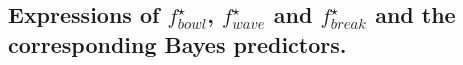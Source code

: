 \documentclass{article}
\newcommand{\E}{\mathbb{E}}
\newcommand{\sqb}[1]{\left[#1\right]}
\theoremstyle{plain}
\begin{document}





\subsection{Expressions of $f^\star_{bowl}$, $f^\star_{wave}$ and $f^\star_{break}$ and the corresponding Bayes predictors.}
\label{ss:f_star}
\end{document}
